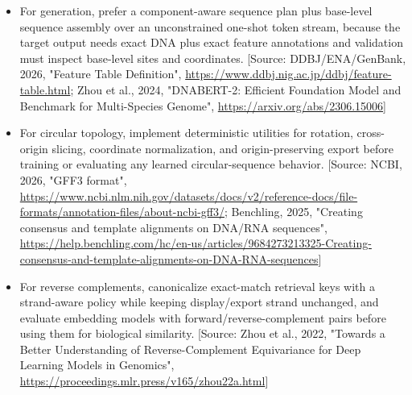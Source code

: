 \documentclass[11pt]{report}
\begin{document}
\begin{itemize}
\item For generation, prefer a component-aware sequence plan plus base-level sequence assembly over an unconstrained one-shot token stream, because the target output needs exact DNA plus exact feature annotations and validation must inspect base-level sites and coordinates. [Source: DDBJ/ENA/GenBank, 2026, "Feature Table Definition", \url{https://www.ddbj.nig.ac.jp/ddbj/feature-table.html}; Zhou et al., 2024, "DNABERT-2: Efficient Foundation Model and Benchmark for Multi-Species Genome", \url{https://arxiv.org/abs/2306.15006}]
\item For circular topology, implement deterministic utilities for rotation, cross-origin slicing, coordinate normalization, and origin-preserving export before training or evaluating any learned circular-sequence behavior. [Source: NCBI, 2026, "GFF3 format", \url{https://www.ncbi.nlm.nih.gov/datasets/docs/v2/reference-docs/file-formats/annotation-files/about-ncbi-gff3/}; Benchling, 2025, "Creating consensus and template alignments on DNA/RNA sequences", \url{https://help.benchling.com/hc/en-us/articles/9684273213325-Creating-consensus-and-template-alignments-on-DNA-RNA-sequences}]
\item For reverse complements, canonicalize exact-match retrieval keys with a strand-aware policy while keeping display/export strand unchanged, and evaluate embedding models with forward/reverse-complement pairs before using them for biological similarity. [Source: Zhou et al., 2022, "Towards a Better Understanding of Reverse-Complement Equivariance for Deep Learning Models in Genomics", \url{https://proceedings.mlr.press/v165/zhou22a.html}]
\end{itemize}
\end{document}
